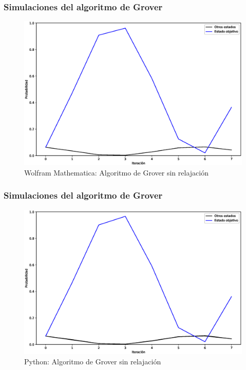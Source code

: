 \documentclass[xetex,mathserif,serif, 8pt]{beamer}
\begin{document}
\begin{frame}
    \frametitle{Simulaciones del algoritmo de Grover}

    \begin{figure}[H]
        \centering
        \includegraphics[width=0.9\linewidth]{img/groverallM.eps}
        \caption{Wolfram Mathematica: Algoritmo de Grover sin relajación}
    \end{figure}

\end{frame}

\begin{frame}
    \frametitle{Simulaciones del algoritmo de Grover}

    \begin{figure}[H]
        \centering
        \includegraphics[width=0.9\linewidth]{img/groveralllossless.eps}
        \caption{Python: Algoritmo de Grover sin relajación}
    \end{figure}

\end{frame}
\end{document}
